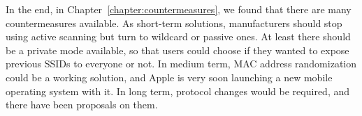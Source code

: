 \documentclass[12pt,a4paper,oneside,pdftex]{report}
\begin{document}
In the end, in Chapter~\ref{chapter:countermeasures}, we found that there are many countermeasures available. As short-term solutions, manufacturers should stop using active scanning but turn to wildcard or passive ones. At least there should be a private mode available, so that users could choose if they wanted to expose previous SSIDs to everyone or not. In medium term, MAC address randomization could be a working solution, and Apple is very soon launching a new mobile operating system with it. In long term, protocol changes would be required, and there have been proposals on them.

% 





\end{document}
